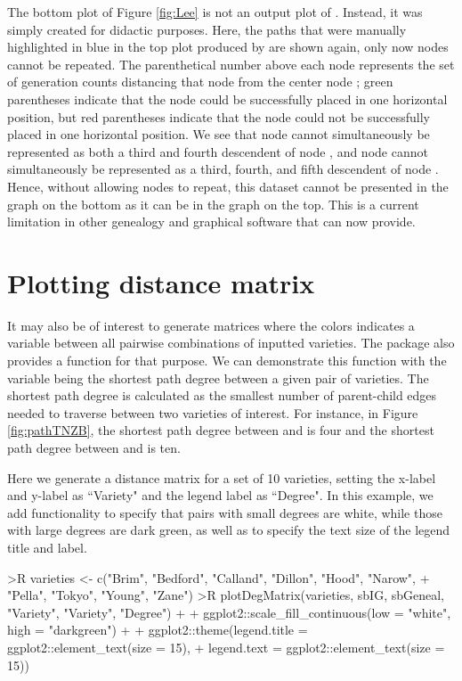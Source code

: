 \documentclass[article,shortnames]{jss}
\begin{document}
The bottom plot of Figure \ref{fig:Lee} is not an output plot of . Instead, it was simply created for didactic purposes. Here, the paths that were manually highlighted in blue in the top plot produced by  are shown again, only now nodes cannot be repeated. The parenthetical number above each node represents the set of generation counts distancing that node from the center node ; green parentheses indicate that the node could be successfully placed in one horizontal position, but red parentheses indicate that the node could not be successfully placed in one horizontal position. We see that node  cannot simultaneously be represented as both a third and fourth descendent of node , and node  cannot simultaneously be represented as a third, fourth, and fifth descendent of node . Hence, without allowing nodes to repeat, this dataset cannot be presented in the graph on the bottom as it can be in the  graph on the top. This is a current limitation in other genealogy and graphical software that  can now provide.

\section{Plotting distance matrix}
\label{pdm}

It may also be of interest to generate matrices where the colors indicates a variable between all pairwise combinations of inputted varieties. The package  also provides a function  for that purpose. We can demonstrate this function with the variable being the shortest path degree between a given pair of varieties. The shortest path degree is calculated as the smallest number of parent-child edges needed to traverse between two varieties of interest. For instance, in Figure \ref{fig:pathTNZB}, the shortest path degree between  and  is four and the shortest path degree between  and  is ten.

Here we generate a distance matrix for a set of 10 varieties, setting the x-label and y-label as ``Variety" and the legend label as ``Degree". In this example, we add  functionality to specify that pairs with small degrees are white, while those with large degrees are dark green, as well as to specify the text size of the legend title and label.

\begin{Code}
>R varieties <- c("Brim", "Bedford", "Calland", "Dillon", "Hood", "Narow",
+    "Pella", "Tokyo", "Young", "Zane")
>R plotDegMatrix(varieties, sbIG, sbGeneal, "Variety", "Variety", "Degree") +
+    ggplot2::scale_fill_continuous(low = "white", high = "darkgreen") +
+    ggplot2::theme(legend.title = ggplot2::element_text(size = 15),
+    legend.text = ggplot2::element_text(size = 15))
\end{Code}
\end{document}
